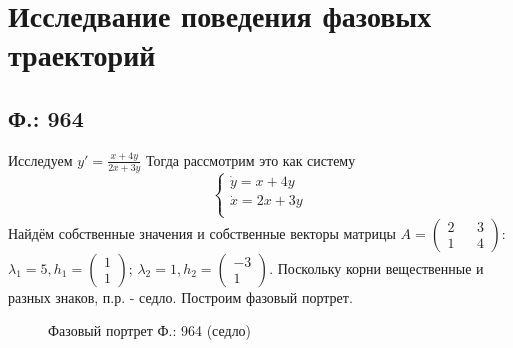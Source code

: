 \documentclass{article}
\begin{document}
\section{Исследвание поведения фазовых траекторий}

\textcolor[rgb]{1,1,1}{ }
\subsection{Ф.: 964}
Исследуем $y'=\frac{x+4y}{2x+3y}$ Тогда рассмотрим это как систему 
\begin{equation}
\begin{cases}
        \dot{y}=x+4y\\
        \dot{x}=2x+3y\\
    \end{cases}    
\end{equation}
Найдём собственные значения и собственные векторы матрицы $A=\begin{pmatrix}2 && 3 \\ 1 && 4 \end{pmatrix}$:\\
 $\lambda_1= 5,h_1 = \begin{pmatrix}1  \\  1 \end{pmatrix} $; $\lambda_2= 1,h_2 = \begin{pmatrix} -3  \\  1 \end{pmatrix} $. Поскольку корни вещественные и разных знаков, п.р. - седло. Построим фазовый портрет.
 \begin{figure}[ht]
\caption{Фазовый портрет Ф.: 964 (седло)}
\label{964}
\end{figure}
\end{document}
